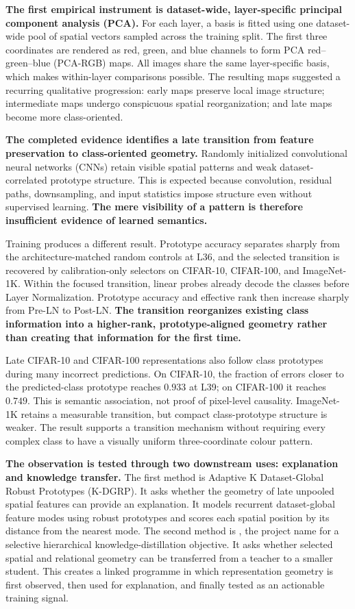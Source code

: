 \textbf{The first empirical instrument is dataset-wide, layer-specific
principal component analysis (PCA).} For each layer, a basis is fitted using
one dataset-wide pool of spatial vectors sampled across the training split. The
first three coordinates are rendered as red, green, and blue channels to form
PCA red--green--blue (PCA-RGB) maps. All images share the same layer-specific
basis, which makes within-layer comparisons possible. The resulting maps
suggested a recurring qualitative progression: early maps preserve local image
structure; intermediate maps undergo conspicuous spatial reorganization; and
late maps become more class-oriented.

\textbf{The completed evidence identifies a late transition from feature
preservation to class-oriented geometry.} Randomly initialized convolutional
neural networks (CNNs) retain visible spatial patterns and weak
dataset-correlated prototype structure. This is expected because convolution,
residual paths, downsampling, and input statistics impose structure even
without supervised learning. \textbf{The mere visibility of a pattern is
therefore insufficient evidence of learned semantics.}

Training produces a different result. Prototype accuracy separates sharply from
the architecture-matched random controls at L36, and the selected transition is
recovered by calibration-only selectors on CIFAR-10, CIFAR-100, and
ImageNet-1K. Within the focused transition, linear probes already decode the
classes before Layer Normalization. Prototype accuracy and effective rank then
increase sharply from Pre-LN to Post-LN. \textbf{The transition reorganizes
existing class information into a higher-rank, prototype-aligned geometry
rather than creating that information for the first time.}

Late CIFAR-10 and CIFAR-100 representations also follow class prototypes during
many incorrect predictions. On CIFAR-10, the fraction of errors closer to the
predicted-class prototype reaches $0.933$ at L39; on CIFAR-100 it reaches
$0.749$. This is semantic association, not proof of pixel-level causality.
ImageNet-1K retains a measurable transition, but compact class-prototype
structure is weaker. The result supports a transition mechanism without
requiring every complex class to have a visually uniform three-coordinate
colour pattern.

\textbf{The observation is tested through two downstream uses: explanation and
knowledge transfer.} The first method is Adaptive K Dataset-Global Robust
Prototypes (K-DGRP). It asks whether the geometry of late unpooled spatial
features can provide an explanation. It models recurrent dataset-global feature
modes using robust prototypes and scores each spatial position by its distance
from the nearest mode. The second method is \jmethod{}, the project name for a
selective hierarchical knowledge-distillation objective. It asks whether
selected spatial and relational geometry can be transferred from a teacher to a
smaller student. This creates a linked programme in which representation
geometry is first observed, then used for explanation, and finally tested as an
actionable training signal.

